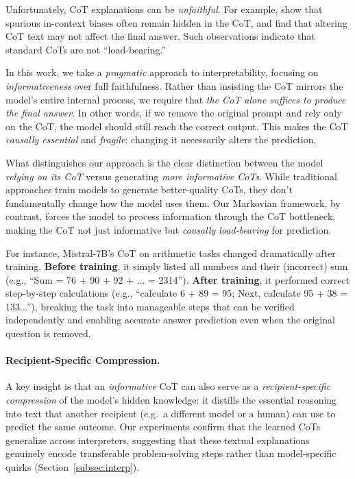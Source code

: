 \documentclass{article} %
\begin{document}
Unfortunately, CoT explanations can be \emph{unfaithful}. For example, \citet{turpin2023language} show that spurious in-context biases often remain hidden in the CoT, and \citet{lanham2023measuring} find that altering CoT text may not affect the final answer. Such observations indicate that standard CoTs are not ``load-bearing.''

In this work, we take a \emph{pragmatic} approach to interpretability, focusing on \emph{informativeness} over full faithfulness. Rather than insisting the CoT mirrors the model's entire internal process, we require that \emph{the CoT alone suffices to produce the final answer}. In other words, if we remove the original prompt and rely only on the CoT, the model should still reach the correct output. This makes the CoT \emph{causally essential} and \emph{fragile}: changing it necessarily alters the prediction.

What distinguishes our approach is the clear distinction between the model \emph{relying on its CoT} versus generating \emph{more informative CoTs}. While traditional approaches train models to generate better-quality CoTs, they don't fundamentally change how the model uses them. Our Markovian framework, by contrast, forces the model to process information through the CoT bottleneck, making the CoT not just informative but \emph{causally load-bearing} for prediction.

For instance, Mistral-7B's CoT on arithmetic tasks changed dramatically after training. \textbf{Before training}, it simply listed all numbers and their (incorrect) sum (e.g., ``Sum = 76 + 90 + 92 + ... = 2314''). \textbf{After training}, it performed correct step-by-step calculations (e.g., ``calculate 6 + 89 = 95; Next, calculate 95 + 38 = 133...''), breaking the task into manageable steps that can be verified independently and enabling accurate answer prediction even when the original question is removed.

\paragraph{Recipient-Specific Compression.}
A key insight is that an \emph{informative} CoT can also serve as a \emph{recipient-specific compression} of the model's hidden knowledge: it distills the essential reasoning into text that another recipient (e.g.\ a different model or a human) can use to predict the same outcome. Our experiments confirm that the learned CoTs generalize across interpreters, suggesting that these textual explanations genuinely encode transferable problem-solving steps rather than model-specific quirks (Section~\ref{subsec:interp}).
\end{document}
